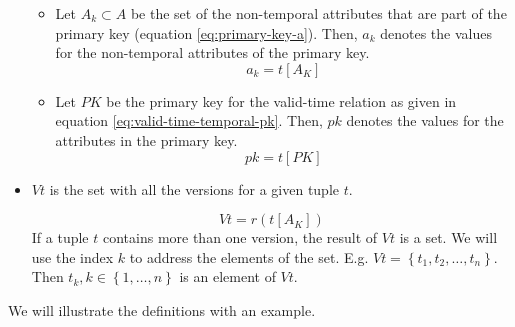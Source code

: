 \begin{definition}
\begin{itemize}
\begin{itemize}
      \item Let $A_k \subset A$ be the set of the non-temporal attributes that are part of the primary key (equation \eqref{eq:primary-key-a}). Then, $a_k$ denotes the values for the non-temporal attributes of the primary key.
	    \begin{equation}
	     \label{eq:pk-attribute} 
	      a_k = t\left[A_K \right]
	    \end{equation}

    \item Let $PK$ be the primary key for the valid-time relation as given in equation \eqref{eq:valid-time-temporal-pk}. Then, $pk$ denotes the values for the attributes in the primary key.
	  \begin{equation}
	   \label{eq:value-pk}
	  pk = t\left[PK \right]
	  \end{equation}


      \end{itemize}
\item $Vt$ is the set with all the versions for a given tuple $t$.

\begin{equation}
 \label{eq:all-the-versions}
Vt = r\left(t\left[A_K\right] \right)
\end{equation}
If a tuple $t$ contains more than one version, the result of $Vt$ is a set. We will use the index $k$ to address the elements of the set. E.g. $Vt = \left \lbrace t_1, t_2, \ldots, t_n \right \rbrace$. Then $t_k , k \in \left \lbrace 1, \ldots, n \right \rbrace$ is an element of $Vt$.
\end{itemize}
\end{definition}
We will illustrate the definitions with an example.

